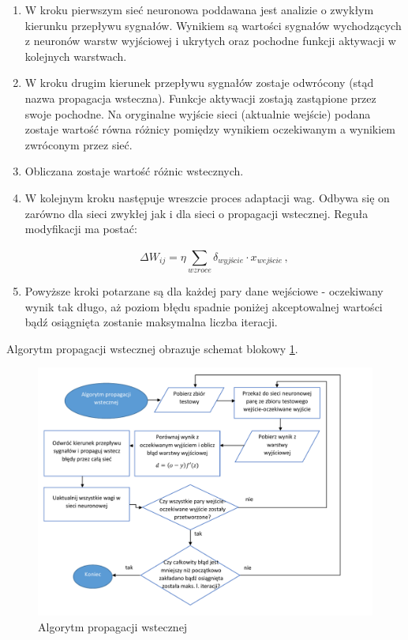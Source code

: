 \documentclass[twoside]{iisthesis}
\begin{document}
		 \begin{enumerate}
		 	\item W kroku pierwszym sieć neuronowa poddawana jest analizie o zwykłym kierunku przepływu sygnałów. Wynikiem są wartości sygnałów wychodzących z neuronów warstw wyjściowej i ukrytych oraz pochodne funkcji aktywacji w kolejnych warstwach. 
		 	
		 	\item W kroku drugim kierunek przepływu sygnałów zostaje odwrócony (stąd nazwa propagacja wsteczna). Funkcje aktywacji zostają zastąpione przez swoje pochodne. Na oryginalne wyjście sieci (aktualnie wejście) podana zostaje wartość równa różnicy pomiędzy wynikiem oczekiwanym a wynikiem zwróconym przez sieć. 
		 	
		 	\item Obliczana zostaje wartość różnic wstecznych.
		 	
			\item W kolejnym kroku następuje wreszcie proces adaptacji wag. Odbywa się on zarówno dla sieci zwykłej jak i dla sieci o propagacji wstecznej. Reguła modyfikacji ma postać: 

			\begin{equation}
			\label{eq:weightadaptation4}
			\Delta W_{ij} = \eta \sum_{wzroce}^{} \delta_{wyjście} \cdot x_{wejście}
			\,,
			\end{equation}
			
			\item Powyższe kroki potarzane są dla każdej pary dane wejściowe - oczekiwany wynik tak długo, aż poziom błędu spadnie poniżej akceptowalnej wartości bądź osiągnięta zostanie maksymalna liczba iteracji. 

		 \end{enumerate}
				 
		 Algorytm propagacji wstecznej obrazuje schemat blokowy \ref{fig:propagacjawsteczna}.
		 
			\begin{figure}[!ht] 
				\centering
				\includegraphics[width=1\textwidth]{propagacjawsteczna}
				\caption{Algorytm propagacji wstecznej}
				\label{fig:propagacjawsteczna}
			\end{figure}
			
\end{document}
